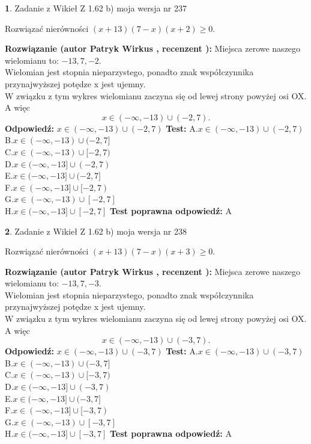 \documentclass[12pt, a4paper]{article}
\theoremstyle{definition} %
\newtheorem{zad}{}
\newcommand{\zadStart}[1]{\begin{zad}#1\newline}
\newcommand{\zadStop}{\end{zad}}
\newcommand{\rozwStart}[2]{\noindent \textbf{Rozwiązanie (autor #1 , recenzent #2): }\newline}
\newcommand{\rozwStop}{\newline}
\newcommand{\odpStart}{\noindent \textbf{Odpowiedź:}\newline}
\newcommand{\odpStop}{\newline}
\newcommand{\testStart}{\noindent \textbf{Test:}\newline}
\newcommand{\testStop}{\newline}
\newcommand{\kluczStart}{\noindent \textbf{Test poprawna odpowiedź:}\newline}
\newcommand{\kluczStop}{\newline}
\begin{document}
\zadStart{Zadanie z Wikieł Z 1.62 b) moja wersja nr 237}

Rozwiązać nierówności $(x+13)(7-x)(x+2)\ge0$.
\zadStop
\rozwStart{Patryk Wirkus}{}
Miejsca zerowe naszego wielomianu to: $-13, 7, -2$.\\
Wielomian jest stopnia nieparzystego, ponadto znak współczynnika przy\linebreak najwyższej potędze x jest ujemny.\\ W związku z tym wykres wielomianu zaczyna się od lewej strony powyżej osi OX. A więc $$x \in (-\infty,-13) \cup (-2,7).$$
\rozwStop
\odpStart
$x \in (-\infty,-13) \cup (-2,7)$
\odpStop
\testStart
A.$x \in (-\infty,-13) \cup (-2,7)$\\
B.$x \in (-\infty,-13) \cup (-2,7]$\\
C.$x \in (-\infty,-13) \cup [-2,7)$\\
D.$x \in (-\infty,-13] \cup (-2,7)$\\
E.$x \in (-\infty,-13] \cup (-2,7]$\\
F.$x \in (-\infty,-13] \cup [-2,7)$\\
G.$x \in (-\infty,-13) \cup [-2,7]$\\
H.$x \in (-\infty,-13] \cup [-2,7]$
\testStop
\kluczStart
A
\kluczStop



\zadStart{Zadanie z Wikieł Z 1.62 b) moja wersja nr 238}

Rozwiązać nierówności $(x+13)(7-x)(x+3)\ge0$.
\zadStop
\rozwStart{Patryk Wirkus}{}
Miejsca zerowe naszego wielomianu to: $-13, 7, -3$.\\
Wielomian jest stopnia nieparzystego, ponadto znak współczynnika przy\linebreak najwyższej potędze x jest ujemny.\\ W związku z tym wykres wielomianu zaczyna się od lewej strony powyżej osi OX. A więc $$x \in (-\infty,-13) \cup (-3,7).$$
\rozwStop
\odpStart
$x \in (-\infty,-13) \cup (-3,7)$
\odpStop
\testStart
A.$x \in (-\infty,-13) \cup (-3,7)$\\
B.$x \in (-\infty,-13) \cup (-3,7]$\\
C.$x \in (-\infty,-13) \cup [-3,7)$\\
D.$x \in (-\infty,-13] \cup (-3,7)$\\
E.$x \in (-\infty,-13] \cup (-3,7]$\\
F.$x \in (-\infty,-13] \cup [-3,7)$\\
G.$x \in (-\infty,-13) \cup [-3,7]$\\
H.$x \in (-\infty,-13] \cup [-3,7]$
\testStop
\kluczStart
A
\kluczStop
\end{document}
